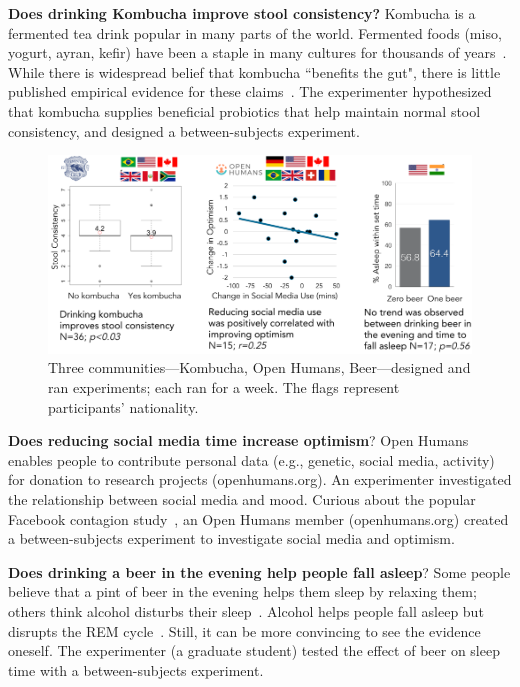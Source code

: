 \textbf{Does drinking Kombucha improve stool consistency?} Kombucha is a fermented tea drink popular in many parts of the world. Fermented foods (miso, yogurt, ayran, kefir) have been a staple in many cultures for thousands of years~\cite{Chilton2015}. While there is widespread belief that kombucha ``benefits the gut", there is little published empirical evidence for these claims~\cite{Ernst2003}. The experimenter hypothesized that kombucha supplies beneficial probiotics that help maintain normal stool consistency, and designed a between-subjects experiment.

\begin{figure}[h] 
\centering
  \includegraphics[width=1.0\textwidth]{figures/galileo/galileo-study3}
  \caption[Three communities---Kombucha, Open Humans, Beer---designed and ran experiments]
{Three communities---Kombucha, Open Humans, Beer---designed and ran experiments; each ran for a week. The flags represent participants' nationality. }
  \label{fig:galileo-10-result}
\end{figure}

\textbf{Does reducing social media time increase optimism}? Open Humans enables people to contribute personal data (e.g., genetic, social media, activity) for donation to research projects (openhumans.org). An experimenter investigated the relationship between social media and mood. Curious about the popular Facebook contagion study~\cite{Coviello2014}, an Open Humans member (openhumans.org) created a between-subjects experiment to investigate social media and optimism.

\textbf{Does drinking a beer in the evening help people fall asleep}? Some people believe that a pint of beer in the evening helps them sleep by relaxing them; others think alcohol disturbs their sleep~\cite{Ph.D.}. Alcohol helps people fall asleep but disrupts the REM cycle~\cite{Ebrahim2013}. Still, it can be more convincing to see the evidence oneself. The experimenter (a graduate student) tested the effect of beer on sleep time with a between-subjects experiment. 

